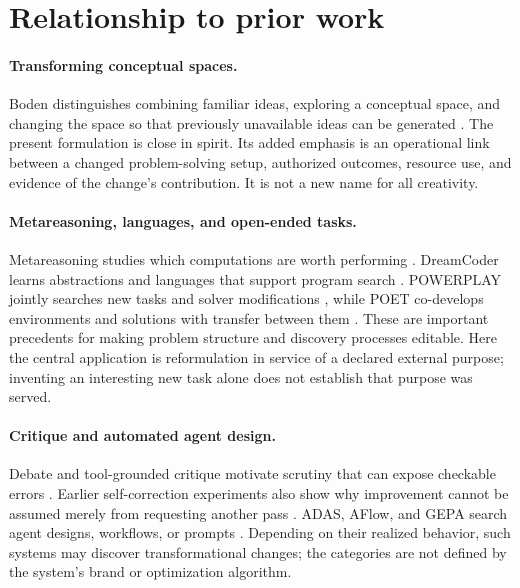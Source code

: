 \documentclass[11pt,letterpaper]{article}
\theoremstyle{remark}\newtheorem{remark}{Remark}[section]
\begin{document}
\section{Relationship to prior work}
\label{sec:related}
\paragraph{Transforming conceptual spaces.}
Boden distinguishes combining familiar ideas, exploring a conceptual space, and changing the space so that previously unavailable ideas can be generated \citep{boden1998creativity}. The present formulation is close in spirit. Its added emphasis is an operational link between a changed problem-solving setup, authorized outcomes, resource use, and evidence of the change's contribution. It is not a new name for all creativity.

\paragraph{Metareasoning, languages, and open-ended tasks.}
Metareasoning studies which computations are worth performing \citep{hay2012selecting}. DreamCoder learns abstractions and languages that support program search \citep{ellis2020dreamcoder}. POWERPLAY jointly searches new tasks and solver modifications \citep{schmidhuber2011powerplay}, while POET co-develops environments and solutions with transfer between them \citep{wang2019poet}. These are important precedents for making problem structure and discovery processes editable. Here the central application is reformulation in service of a declared external purpose; inventing an interesting new task alone does not establish that purpose was served.

\paragraph{Critique and automated agent design.}
Debate and tool-grounded critique motivate scrutiny that can expose checkable errors \citep{irving2018debate,gou2023critic}. Earlier self-correction experiments also show why improvement cannot be assumed merely from requesting another pass \citep{huang2023selfcorrect}. ADAS, AFlow, and GEPA search agent designs, workflows, or prompts \citep{hu2024adas,zhang2024aflow,agrawal2025gepa}. Depending on their realized behavior, such systems may discover transformational changes; the categories are not defined by the system's brand or optimization algorithm.
\end{document}
